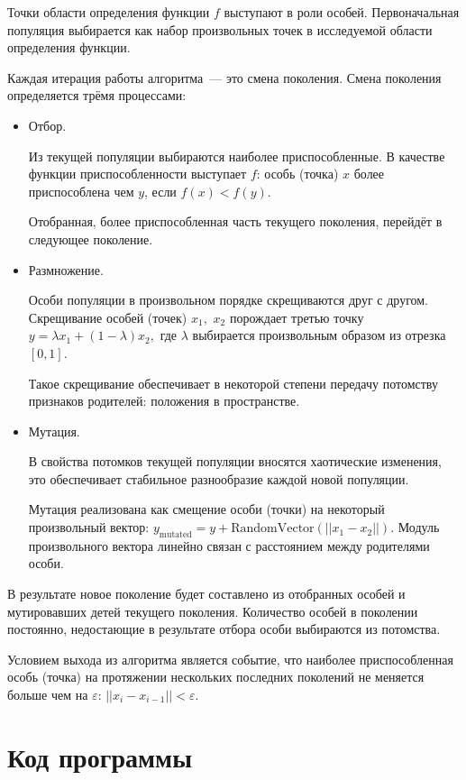 \documentclass[10pt,a4paper,titlepage]{article}
\begin{document}
Точки области определения функции $f$ выступают в роли особей. 
Первоначальная популяция выбирается как набор произвольных точек в исследуемой области определения функции.

Каждая итерация работы алгоритма~--- это смена поколения. 
Смена поколения определяется трёмя процессами:
\begin{itemize}
  \item Отбор. 
  
    Из текущей популяции выбираются наиболее приспособленные.
    В качестве функции приспособленности выступает $f$: особь (точка) $x$ более приспособлена чем $y$, 
    если $f(x) < f(y)$.
  
    Отобранная, более приспособленная часть текущего поколения, перейдёт в следующее поколение.
  \item Размножение. 
  
    Особи популяции в произвольном порядке скрещиваются друг с другом.
    Скрещивание особей (точек) $x_1,$ $x_2$ порождает третью точку $y = \lambda x_1 + (1 - \lambda) x_2,$
    где $\lambda$ выбирается произвольным образом из отрезка $[0, 1]$.
    
    Такое скрещивание обеспечивает в некоторой степени передачу потомству признаков родителей: 
    положения в пространстве.
    
  \item Мутация.
  
    В свойства потомков текущей популяции вносятся хаотические изменения, 
    это обеспечивает стабильное разнообразие каждой новой популяции.
    
    Мутация реализована как смещение особи (точки) на некоторый произвольный вектор:
    $y_{\textrm{mutated}} = y + \textrm{RandomVector}(||x_1 - x_2||).$ 
    Модуль произвольного вектора линейно связан с расстоянием между родителями особи.
\end{itemize}

В результате новое поколение будет составлено из отобранных особей и мутировавших детей текущего поколения. 
Количество особей в поколении постоянно, недостающие в результате отбора особи выбираются из потомства.

Условием выхода из алгоритма является событие, что наиболее приспособленная особь (точка) на протяжении нескольких последних
поколений не меняется больше чем на $\varepsilon$: $||x_i - x_{i-1}|| < \varepsilon$.

\section{Код программы}
\end{document}
